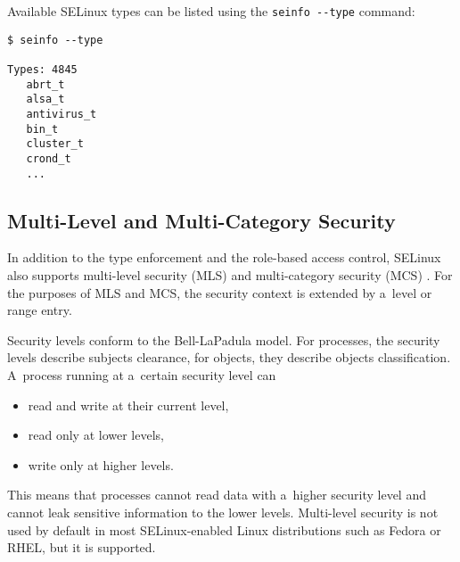 Available SELinux types can be listed using the \texttt{seinfo -{}-type}
command:
\begin{lstlisting}
$ seinfo --type

Types: 4845
   abrt_t
   alsa_t
   antivirus_t
   bin_t
   cluster_t
   crond_t
   ...
\end{lstlisting}

\subsection{Multi-Level and Multi-Category Security}
\label{mls}
In addition to the type enforcement and the role-based access control, SELinux
also supports multi-level security (MLS) and multi-category security (MCS)
\cite[pp.~48--53]{tsn}. For the purposes of MLS and MCS, the security context is
extended by a~level or range entry.

Security levels conform to the Bell-LaPadula model. For processes, the security
levels describe subjects clearance, for objects, they describe objects
classification. A~process running at a~certain security level can
\begin{itemize}
    \item read and write at their current level,
    \item read only at lower levels,
    \item write only at higher levels.
\end{itemize}
This means that processes cannot read data with a~higher security level and
cannot leak sensitive information to the lower levels. Multi-level security is
not used by default in most SELinux-enabled Linux distributions such as Fedora
or RHEL, but it is supported.

